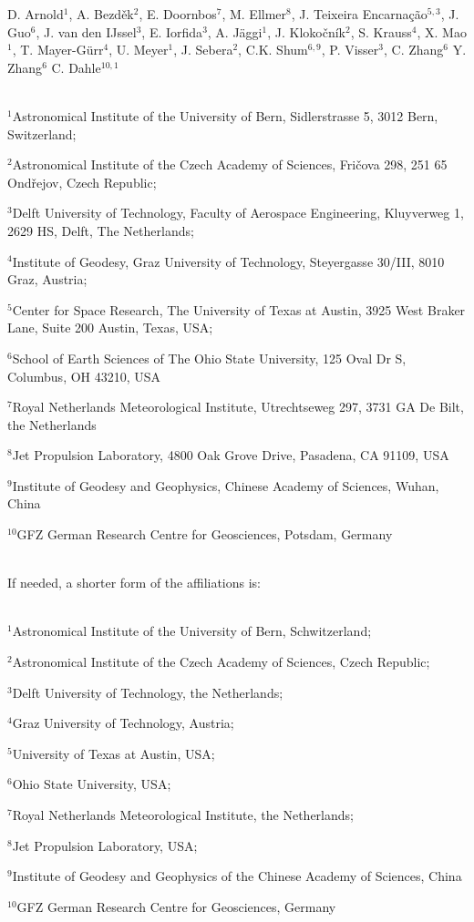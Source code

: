 \documentclass[11pt,a4paper,oneside]{article}
\begin{document}
D. Arnold$^1$, %
A. Bezd\v{e}k$^2$, %
E. Doornbos$^7$, %
M. Ellmer$^8$, %
J. Teixeira Encarna\c c\~ao$^{5,3}$, %
J. Guo$^6$, %
J. van den IJssel$^3$, %
E. Iorfida$^3$, %
A. J\"{a}ggi$^1$, %
J. Kloko\v{c}n\'{i}k$^2$, %
S. Krauss$^4$,
X. Mao$^1$, %
T. Mayer-G\"{u}rr$^4$, %
U. Meyer$^1$, %
J. Sebera$^2$, %
C.K. Shum$^{6,9}$, %
P. Visser$^3$, %
C. Zhang$^6$ %
Y. Zhang$^6$
C. Dahle$^{10,1}$

~\\

$^1$Astronomical Institute of the University of Bern, Sidlerstrasse 5, 3012 Bern, Switzerland;

$^2$Astronomical Institute of the Czech Academy of Sciences, Fri\v{c}ova 298, 251 65 Ond\v{r}ejov, Czech Republic;

$^3$Delft University of Technology, Faculty of Aerospace Engineering, Kluyverweg 1, 2629 HS, Delft, The Netherlands;

$^4$Institute of Geodesy, Graz University of Technology, Steyergasse 30/III, 8010 Graz, Austria;

$^5$Center for Space Research, The University of Texas at Austin, 3925 West Braker Lane, Suite 200 Austin, Texas, USA;

$^6$School of Earth Sciences of The Ohio State University, 125 Oval Dr S, Columbus, OH 43210, USA

$^7$Royal Netherlands Meteorological Institute, Utrechtseweg 297, 3731 GA De Bilt, the Netherlands

$^8$Jet Propulsion Laboratory, 4800 Oak Grove Drive, Pasadena, CA 91109, USA

$^9$Institute of Geodesy and Geophysics, Chinese Academy of Sciences, Wuhan, China

$^{10}$GFZ German Research Centre for Geosciences, Potsdam, Germany

~\\

If needed, a shorter form of the affiliations is:

~\\

$^1$Astronomical Institute of the University of Bern, Schwitzerland;

$^2$Astronomical Institute of the Czech Academy of Sciences, Czech Republic;

$^3$Delft University of Technology, the Netherlands;

$^4$Graz University of Technology, Austria;

$^5$University of Texas at Austin, USA;

$^6$Ohio State University, USA;

$^7$Royal Netherlands Meteorological Institute, the Netherlands;

$^8$Jet Propulsion Laboratory, USA;

$^9$Institute of Geodesy and Geophysics of the Chinese Academy of Sciences, China

$^{10}$GFZ German Research Centre for Geosciences, Germany
\end{document}
